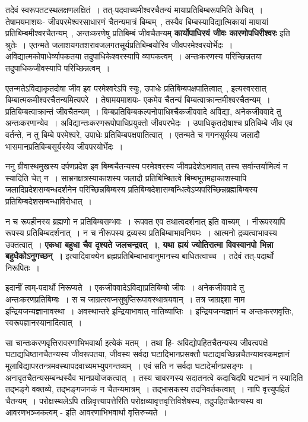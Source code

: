 	तदेवं स्वरूपतटस्थलक्षणलक्षितं~। तत्-पदवाच्यमीश्वरचैतन्यं मायाप्रतिबिम्बरूपमिति केचित्~। तेषामयमाशयः- जीवपरमेश्वरसाधारणं चैतन्यमात्रं बिम्बम्~, तस्यैव बिम्बस्याविद्यात्मिकायां मायायां प्रतिबिम्बमीश्वरचैतन्यम्~, अन्तःकरणेषु प्रतिबिम्बं जीवचैतन्यम् {\bfseries कार्योपाधिरयं जीवः कारणोपधिरीश्वरः} इति श्रुतेः~। एतन्मते जलाशयगतशरावजलगतसूर्यप्रतिबिम्बयोरिव जीवपरमेश्वरयोर्भेदः~। अविद्यात्मकोपाधेर्व्यापकतया तदुपाधिकेश्वरस्यापि व्यापकत्वम्~। अन्तःकरणस्य परिच्छिन्नतया तदुपाधिकजीवस्यापि परिच्छिन्नत्वम्~।\par
	एतन्मतेऽविद्याकृतदोषा जीव इव परमेश्वरेऽपि स्युः, उपाधेः प्रतिबिम्बपक्षपातित्वात्~, इत्यस्वरसात् बिम्बात्मकमीश्वरचैतन्यमित्यपरे~। तेषामयमाशयः- एकमेव चैतन्यं बिम्बत्वाक्रान्तमीश्वरचैतन्यम्~। प्रतिबिम्बत्वाक्रान्तं जीवचैतन्यम्~। बिम्बप्रतिबिम्बकल्पनोपाधिश्चैकजीववादे अविद्या, अनेकजीववादे तु अन्तःकरणान्येव~। अविद्यान्तःकरणरूपोपाधिप्रयुक्तो जीवपरभेदः~। उपाधिकृतदोषाश्च प्रतिबिम्बे जीव एव वर्तन्ते, न तु बिम्बे परमेश्वरे, उपाधेः प्रतिबिम्बपक्षपातित्वात्~। एतन्मते च गगनसूर्यस्य जलादौ भासमानप्रतिबिम्बसूर्यस्येव जीवपरयोर्भेदः~।\par
	ननु ग्रीवास्थमुखस्य दर्पणप्रदेश इव बिम्बचैतन्यस्य परमेश्वरस्य जीवप्रदेशेऽभावात् तस्य सर्वान्तर्यामित्वं न स्यादिति चेत् न~। साभ्रनक्षत्रस्याकाशस्य जलादौ प्रतिबिम्बितत्वे बिम्बभूतमहाकाशस्यापि जलादिप्रदेशसम्बन्धदर्शनेन परिच्छिन्नबिम्बस्य प्रतिबिम्बदेशासम्बन्धित्वेऽप्यपरिच्छिन्नब्रह्मबिम्बस्य प्रतिबिम्बदेशसम्बन्धाविरोधात्~। \par
	 न च रूपहीनस्य ब्रह्मणो न प्रतिबिम्बसम्भवः~। रूपवत एव तथात्वदर्शनात् इति वाच्यम्~। नीरूपस्यापि रूपस्य प्रतिबिम्बदर्शनात्~। न च नीरूपस्य द्रव्यस्य प्रतिबिम्बाभावनियमः~। आत्मनो द्रव्यत्वाभावस्य उक्तत्वात्~। {\bfseries एकधा बहुधा चैव दृश्यते जलचन्द्रवत्~।}, {\bfseries यथा ह्ययं ज्योतिरात्मा विवस्वानपो भिन्ना बहुधैकोऽनुगच्छन्~।} इत्यादिवाक्येन ब्रह्मप्रतिबिम्बाभावानुमानस्य बाधितत्वाच्च~। तदेवं तत्-पदार्थो निरूपितः~।\par
	इदानीं त्वम्-पदार्थो निरूप्यते~। एकजीववादेऽविद्याप्रतिबिम्बो जीवः~। अनेकजीववादे तु अन्तःकरणप्रतिबिम्बः~। स च जाग्रत्स्वप्नसुषुप्तिरूपावस्थात्रयवान्~। तत्र जाग्रद्दशा नाम इन्द्रियजन्यज्ञानावस्था~। अवस्थान्तरे इन्द्रियाभावात् नातिव्याप्तिः~। इन्द्रियजन्यज्ञानं च अन्तःकरणवृत्तिः, स्वरूपज्ञानस्यानादित्वात्~।\par
	सा चान्तःकरणवृत्तिरावरणाभिभवार्था इत्येकं मतम्~। तथा हि- अविद्योपहितचैतन्यस्य जीवत्वपक्षे घटाद्यधिष्ठानचैतन्यस्य जीवरूपतया, जीवस्य सर्वदा घटादिभानप्रसक्तौ घटाद्यवच्छिन्नचैतन्यावरकमज्ञानं मूलाविद्यापरतन्त्रमवस्थापदवाच्यमभ्युपगन्तव्यम्~। एवं सति न सर्वदा घटादेर्भानप्रसङ्गः~। अनावृतचैतन्यसम्बन्धस्यैव भानप्रयोजकत्वात्~। तस्य चावरणस्य सदातनत्वे कदाचिदपि घटभानं न स्यादिति तद्भङ्गे वक्तव्ये, तद्भङ्गजनकं न चैतन्यमात्रम्~। तद्भासकस्य तदनिवर्तकत्वात्~। नापि वृत्त्युपहितं चैतन्यम्~। परोक्षस्थलेऽपि तन्निवृत्त्यापत्तेरिति परोक्षव्यावृत्तवृत्तिविशेषस्य, तदुपहितचैतन्यस्य वा आवरणभञ्जकत्वम् - इति आवरणाभिभवार्था वृत्तिरुच्यते~।\par
